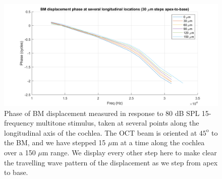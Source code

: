 \documentclass[aip,cp,amsmath,amssymb,reprint]{revtex4-2}
\begin{document}
\begin{figure}[h]
	\includegraphics[width=.7\textwidth]{Figures/displacementacrossl_MOH.png}
	\caption{Phase of BM displacement measured in response to 80 dB SPL 15-frequency multitone stimulus, taken at several points along the longitudinal axis of the cochlea. The OCT beam is oriented at $45^\text{o}$ to the BM, and we have stepped 15 $\mu$m at a time along the cochlea over a 150 $\mu$m range. We display every other step here to make clear the travelling wave pattern of the displacement as we step from apex to base.}
	\label{fig:acrossl}
\end{figure}
\end{document}
